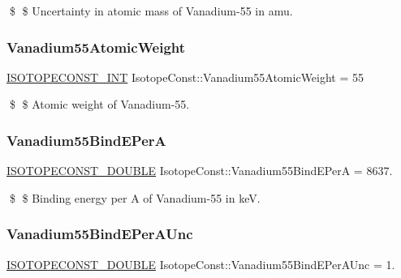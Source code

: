 \$ \$ Uncertainty in atomic mass of Vanadium-\/55 in amu. \mbox{\label{group___isotope_const-_vanadium-_v55_ga14321924dda57093cd8f4671785ef71e}} 
\subsubsection{\texorpdfstring{Vanadium55\+Atomic\+Weight}{Vanadium55AtomicWeight}}
{\footnotesize\ttfamily \mbox{\hyperlink{group___isotope_const-_macros_ga5f18360b3e99483a35c32d789e62621c}{I\+S\+O\+T\+O\+P\+E\+C\+O\+N\+S\+T\+\_\+\+I\+NT}} Isotope\+Const\+::\+Vanadium55\+Atomic\+Weight = 55}

\$ \$ Atomic weight of Vanadium-\/55. \mbox{\label{group___isotope_const-_vanadium-_v55_ga885a343e93c51ed903350b043bb02c81}} 
\subsubsection{\texorpdfstring{Vanadium55\+Bind\+E\+PerA}{Vanadium55BindEPerA}}
{\footnotesize\ttfamily \mbox{\hyperlink{group___isotope_const-_macros_ga8f45a7272ce02c0b4c65c44636ed719a}{I\+S\+O\+T\+O\+P\+E\+C\+O\+N\+S\+T\+\_\+\+D\+O\+U\+B\+LE}} Isotope\+Const\+::\+Vanadium55\+Bind\+E\+PerA = 8637.}

\$ \$ Binding energy per A of Vanadium-\/55 in keV. \mbox{\label{group___isotope_const-_vanadium-_v55_ga6f0b811180947d846ac16b1306de9450}} 
\subsubsection{\texorpdfstring{Vanadium55\+Bind\+E\+Per\+A\+Unc}{Vanadium55BindEPerAUnc}}
{\footnotesize\ttfamily \mbox{\hyperlink{group___isotope_const-_macros_ga8f45a7272ce02c0b4c65c44636ed719a}{I\+S\+O\+T\+O\+P\+E\+C\+O\+N\+S\+T\+\_\+\+D\+O\+U\+B\+LE}} Isotope\+Const\+::\+Vanadium55\+Bind\+E\+Per\+A\+Unc = 1.}

